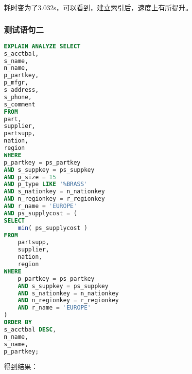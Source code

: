 \documentclass{article}
\begin{document}
耗时变为了3.032s，可以看到，建立索引后，速度上有所提升。

\subsubsection{测试语句二}

\begin{lstlisting}[language=sql]
EXPLAIN ANALYZE SELECT
s_acctbal,
s_name,
n_name,
p_partkey,
p_mfgr,
s_address,
s_phone,
s_comment 
FROM
part,
supplier,
partsupp,
nation,
region 
WHERE
p_partkey = ps_partkey 
AND s_suppkey = ps_suppkey 
AND p_size = 15 
AND p_type LIKE '%BRASS' 
AND s_nationkey = n_nationkey 
AND n_regionkey = r_regionkey 
AND r_name = 'EUROPE' 
AND ps_supplycost = (
SELECT
    min( ps_supplycost ) 
FROM
    partsupp,
    supplier,
    nation,
    region 
WHERE
    p_partkey = ps_partkey 
    AND s_suppkey = ps_suppkey 
    AND s_nationkey = n_nationkey 
    AND n_regionkey = r_regionkey 
    AND r_name = 'EUROPE' 
) 
ORDER BY
s_acctbal DESC,
n_name,
s_name,
p_partkey;
\end{lstlisting}

得到结果：
\end{document}
